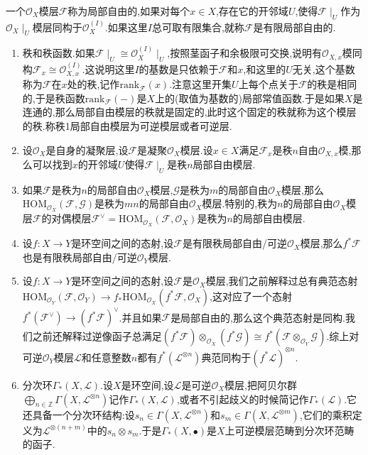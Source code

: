 一个$\mathscr{O}_X$模层$\mathscr{F}$称为局部自由的,如果对每个$x\in X$,存在它的开邻域$U$,使得$\mathscr{F}\mid_U$作为$\mathscr{O}_X\mid_U$模层同构于$\mathscr{O}_X^{(I)}$.如果这里$I$总可取有限集合,就称$\mathscr{F}$是有限局部自由的.
\begin{enumerate}
	\item 秩和秩函数.如果$\mathscr{F}\mid_U\cong\mathscr{O}_X^{(I)}\mid_U$,按照茎函子和余极限可交换,说明有$\mathscr{O}_{X,x}$模同构$\mathscr{F}_x\cong\mathscr{O}_{X,x}^{(I)}$.这说明这里$I$的基数是只依赖于$\mathscr{F}$和$x$,和这里的$U$无关,这个基数称为$\mathscr{F}$在$x$处的秩,记作$\mathrm{rank}_{\mathscr{F}}(x)$.注意这里开集$U$上每个点关于$\mathscr{F}$的秩是相同的,于是秩函数$\mathrm{rank}_{\mathscr{F}}(-)$是$X$上的(取值为基数的)局部常值函数.于是如果$X$是连通的,那么局部自由模层的秩就是固定的,此时这个固定的秩就称为这个模层的秩.称秩1局部自由模层为可逆模层或者可逆层.
	\item 设$\mathscr{O}_X$是自身的凝聚层,设$\mathscr{F}$是凝聚$\mathscr{O}_X$模层.设$x\in X$满足$\mathscr{F}_x$是秩$n$自由$\mathscr{O}_{X,x}$模,那么可以找到$x$的开邻域$U$使得$\mathscr{F}\mid_U$是秩$n$局部自由模层.
	\item 如果$\mathscr{F}$是秩为$n$的局部自由$\mathscr{O}_X$模层,$\mathscr{G}$是秩为$m$的局部自由$\mathscr{O}_X$模层,那么$\mathrm{HOM}_{\mathscr{O}_X}(\mathscr{F},\mathscr{G})$是秩为$mn$的局部自由$\mathscr{O}_X$模层.特别的,秩为$n$的局部自由$\mathscr{O}_X$模层$\mathscr{F}$的对偶模层$\mathscr{F}^{\vee}=\mathrm{HOM}_{\mathscr{O}_X}(\mathscr{F},\mathscr{O}_X)$是秩为$n$的局部自由模层.
	\item 设$f:X\to Y$是环空间之间的态射,设$\mathscr{F}$是有限秩局部自由/可逆$\mathscr{O}_X$模层,那么$f^*\mathscr{F}$也是有限秩局部自由/可逆$\mathscr{O}_Y$模层.
	\item 设$f:X\to Y$是环空间之间的态射,设$\mathscr{F}$是$\mathscr{O}_X$模层,我们之前解释过总有典范态射$\mathrm{HOM}_{\mathscr{O}_Y}(\mathscr{F},\mathscr{O}_Y)\to f_*\mathrm{HOM}_{\mathscr{O}_X}(f^*\mathscr{F},\mathscr{O}_X)$,这对应了一个态射$f^*(\mathscr{F}^{\vee})\to(f^*\mathscr{F})^{\vee}$.并且如果$\mathscr{F}$是局部自由的,那么这个典范态射是同构.我们之前还解释过逆像函子总满足$(f^*\mathscr{F})\otimes_{\mathscr{O}_X}(f^*\mathscr{G})\cong f^*(\mathscr{F}\otimes_{\mathscr{O}_Y}\mathscr{G})$.综上对可逆$\mathscr{O}_Y$模层$\mathscr{L}$和任意整数$n$都有$f^*(\mathscr{L}^{\otimes n})$典范同构于$(f^*\mathscr{L})^{\otimes n}$.
	\item 分次环$\Gamma_*(X,\mathscr{L})$.设$X$是环空间,设$\mathscr{L}$是可逆$\mathscr{O}_X$模层,把阿贝尔群$\bigoplus_{n\in\mathbb{Z}}\Gamma(X,\mathscr{L}^{\otimes n})$记作$\Gamma_*(X,\mathscr{L})$,或者不引起歧义的时候简记作$\Gamma_*(\mathscr{L})$.它还具备一个分次环结构:设$s_n\in\Gamma(X,\mathscr{L}^{\otimes n})$和$s_m\in\Gamma(X,\mathscr{L}^{\otimes m})$,它们的乘积定义为$\mathscr{L}^{\otimes(n+m)}$中的$s_n\otimes s_m$.于是$\Gamma_*(X,\bullet)$是$X$上可逆模层范畴到分次环范畴的函子.

\end{enumerate}
